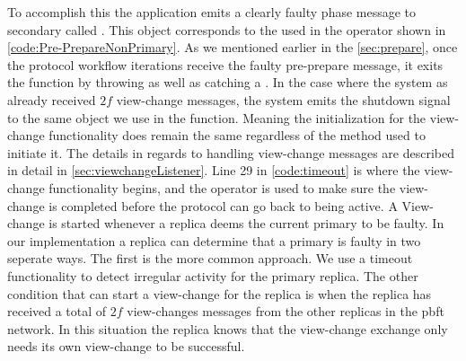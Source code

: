 To accomplish this the application emits a clearly faulty phase message to secondary  called . This  object corresponds to the  used in the  operator shown in \autoref{code:Pre-PrepareNonPrimary}. As we mentioned earlier in the \autoref{sec:prepare}, once the protocol workflow iterations receive the faulty pre-prepare message, it exits the function by throwing as well as catching a . In the case where the system as already received $2f$ view-change messages, the system emits the shutdown signal to the same   object we use in the   function. Meaning the initialization for the view-change functionality does remain the same regardless of the method used to initiate it. The details in regards to handling view-change messages are described in detail in  \autoref{sec:viewchangeListener}. Line 29 in \autoref{code:timeout} is where the view-change functionality begins, and the  operator is used to make sure the view-change is completed before the protocol can go back to being active. 
\fi
\iffalse
A View-change is started whenever a replica deems the current primary to be faulty. In our implementation a replica can determine that a primary is faulty in two seperate ways. The first is the more common approach. We use a timeout functionality to detect irregular activity for the primary replica. The other condition that can start a view-change for the replica is when the replica has received a total of $2f$ view-changes messages from the other replicas in the \ac{pbft} network. In this situation the replica knows that the view-change exchange only needs its own view-change to be successful. 


